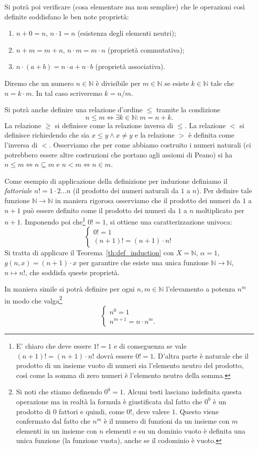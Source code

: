 \documentclass[italian,a4paper,twosides,headinclude]{scrbook}
\renewcommand{\subset}{\subseteq}
\newcommand{\NN}{\mathbb N}
\begin{document}
Si potrà poi verificare (cosa elementare ma non semplice)
che le operazioni così definite soddisfano le ben
note proprietà:
\begin{enumerate}
\item $n+0=n$, $n\cdot 1 = n$ (esistenza degli elementi neutri);
\item $n+m = m+n$, $n\cdot m = m\cdot n$ (proprietà commutativa);
\item $n\cdot (a+b) = n\cdot a + n\cdot b$ (proprietà associativa).
\end{enumerate}

Diremo che un numero $n\in \NN$ è divisibile per $m\in \NN$ se esiste $k\in \NN$
tale che $n = k \cdot m$. In tal caso scriveremo $k = n/m$.

Si potrà anche definire una relazione d'ordine $\le$ tramite la condizione
\[
  n \le m \iff \exists k \in \NN \colon m = n+k.
\]
La relazione $\ge$ si definisce come la relazione inversa di $\le$.
La relazione $<$ si
definisce richiedendo che sia $x\le y \land x\neq y$ e la relazione $>$
è definita come l'inversa di $<$.
Osserviamo che per come abbiamo costruito i numeri naturali (ci potrebbero essere
altre costruzioni che portano agli assiomi di Peano) si ha $n\le m \iff n \subset m$
e $n < m \iff n\in m$.

Come esempio di applicazione della definizione per induzione definiamo
il \emph{fattoriale} $n! = 1 \cdot 2 \dots n$ (il prodotto dei numeri naturali
da $1$ a $n$).
Per definire tale funzione
$\NN \to \NN$ in maniera rigorosa osserviamo che il prodotto dei numeri da $1$
a $n+1$ può essere definito come il prodotto dei numeri da $1$ a $n$ moltiplicato
per $n+1$. Imponendo poi che\footnote{%
E' chiaro che deve essere $1!=1$ e di conseguenza se vale $(n+1)! = (n+1)\cdot n!$
dovrà essere $0!=1$.
D'altra parte è naturale che il prodotto di un insieme vuoto di numeri sia
l'elemento neutro del prodotto, così come la somma di zero numeri è l'elemento
neutro della somma.
}
$0!=1$, si ottiene una caratterizzazione univoca:
\[
 \begin{cases}
  0! = 1 \\
  (n+1)! = (n+1) \cdot n!
 \end{cases}
\]
Si tratta di applicare il Teorema~\ref{th:def_induction}
con $X=\NN$, $\alpha = 1$, $g(n, x) = (n+1)\cdot x$ per garantire che esiste
una unica funzione $\NN\to\NN$, $n\mapsto n!$, che soddisfa queste proprietà.

In maniera simile si potrà definire per ogni $n,m \in \NN$ l'elevamento a potenza $n^m$
in modo che valga\footnote{%
Si noti che stiamo definendo $0^0=1$.
Alcuni testi lasciano indefinita questa operazione ma in realtà la formula
è giustificata dal fatto che $0^0$ è un prodotto di $0$ fattori e quindi,
come $0!$, deve valere $1$.
Questo viene confermato dal fatto che $n^m$ è il numero di funzioni da un
insieme con $m$ elementi in un insieme con $n$ elementi e
su un dominio vuoto è definita una unica funzione (la funzione vuota), anche
se il codominio è vuoto.
}
\[
\begin{cases}
  n^0 = 1\\
  n^{m+1} = n\cdot n^m.
\end{cases}
\]
\end{document}
